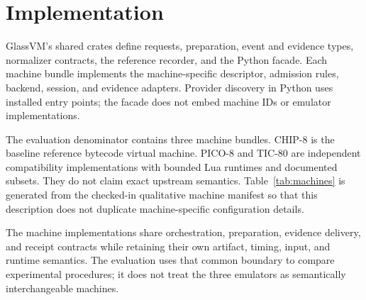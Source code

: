 \section{Implementation}

GlassVM's shared crates define requests, preparation, event and evidence
types, normalizer contracts, the reference recorder, and the Python facade.
Each machine bundle implements the machine-specific descriptor, admission
rules, backend, session, and evidence adapters. Provider discovery in Python
uses installed entry points; the facade does not embed machine IDs or
emulator implementations.

The evaluation denominator contains three machine bundles. CHIP-8 is the
baseline reference bytecode virtual machine. PICO-8 and TIC-80 are independent
compatibility implementations with bounded Lua runtimes and documented
subsets. They do not claim exact upstream semantics. Table~\ref{tab:machines}
is generated from the checked-in qualitative machine manifest so that this
description does not duplicate machine-specific configuration details.

\begin{table}[t]
  \centering
  \small
  \caption{Qualitative machine heterogeneity and implementation boundaries.}
  \label{tab:machines}
  
\end{table}

The machine implementations share orchestration, preparation, evidence
delivery, and receipt contracts while retaining their own artifact, timing,
input, and runtime semantics. The evaluation uses that common boundary to
compare experimental procedures; it does not treat the three emulators as
semantically interchangeable machines.
